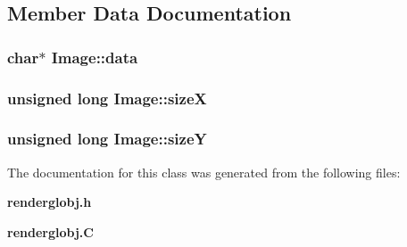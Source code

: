 \subsection{Member Data Documentation}
\subsubsection{\setlength{\rightskip}{0pt plus 5cm}char$\ast$ Image::data}\label{classImage_m2}


\subsubsection{\setlength{\rightskip}{0pt plus 5cm}unsigned long Image::size\-X}\label{classImage_m0}


\subsubsection{\setlength{\rightskip}{0pt plus 5cm}unsigned long Image::size\-Y}\label{classImage_m1}




The documentation for this class was generated from the following files:\begin{CompactItemize}
\item 
{\bf renderglobj.h}\item 
{\bf renderglobj.C}\end{CompactItemize}
